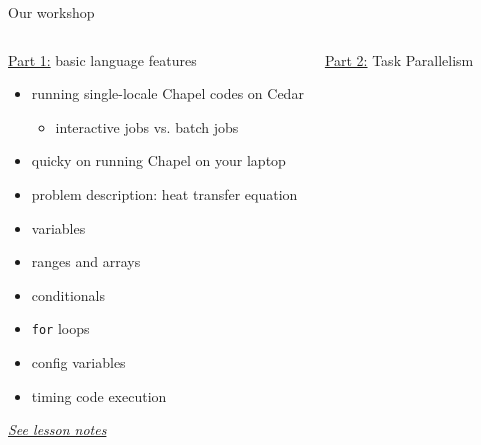 \documentclass[10pt,xcolor=pdftex,dvipsnames,table]{beamer}
\newcommand{\tc}{\textcolor}
\begin{document}
\begin{frame}{Our workshop}
  \vspace{-3mm}
  \begin{columns}[]
    \begin{block}{}
      \begin{center}
        {\sc \underline{Part 1:} basic language features}
      \end{center}
      \vspace{-2mm}
      {\let\normalsize\footnotesize \normalsize
        \begin{itemize}\setlength{\itemsep}{0.6mm}
        \item running single-locale Chapel codes on Cedar
          {\let\small\scriptsize \small
            \begin{itemize}\setlength{\itemsep}{0.5mm}
            \item interactive jobs vs. batch jobs
          \end{itemize}}
        \item quicky on running Chapel on your laptop
        \item problem description: heat transfer equation
        \item variables
        \item ranges and arrays
        \item conditionals
        \item \tc{Mahogany}{\texttt{for}} loops
        \item config variables
        \item timing code execution
        \end{itemize}}
      \begin{center}
        \href{http://bit.ly/2CDRuxQ}{\tc{Mahogany}{\it See lesson notes}}
      \end{center}
    \end{block}
    \begin{block}{}
      \begin{center}
        {\sc \underline{Part 2:} Task Parallelism}
      \end{center}
      \vspace{-2mm}

\end{block}
\end{columns}
\end{frame}
\end{document}
